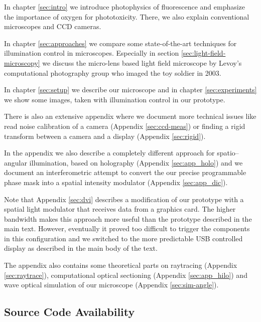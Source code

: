 \documentclass[oneside,a4paper,12pt,BCOR20mm,DIV14]{scrbook}
\begin{document}
In chapter \ref{sec:intro} we introduce photophysics of fluorescence
and emphasize the importance of oxygen for phototoxicity. There, we
also explain conventional microscopes and CCD cameras.

In chapter \ref{sec:approaches} we compare some state-of-the-art
techniques for illumination control in microscopes. %
Especially in section \ref{sec:light-field-microscopy} we discuss the
micro-lens based light field microscope by Levoy's computational
photography group who imaged the toy soldier in 2003.

In chapter \ref{sec:setup} we describe our microscope and in chapter
\ref{sec:experiments} we show some images, taken with illumination
control in our prototype.

There is also an extensive appendix where we document more technical
issues like read noise calibration of a camera (Appendix
\ref{sec:ccd-meas}) or finding a rigid transform between a camera and
a display (Appendix \ref{sec:rigid}).

In the appendix we also describe a completely different approach for
spatio--angular illumination, based on holography (Appendix
\ref{sec:app_holo}) and we document an interferometric attempt to
convert the our precise programmable phase mask into a spatial
intensity modulator (Appendix \ref{sec:app_dic}).

Note that Appendix \ref{sec:dvi} describes a modification of our
prototype with a spatial light modulator that receives data from a
graphics card. The higher bandwidth makes this approach more useful
than the prototype described in the main text. However, eventually it
proved too difficult to trigger the components in this configuration
and we switched to the more predictable USB controlled display as
described in the main body of the text.
 
The appendix also contains some theoretical parts on raytracing
(Appendix \ref{sec:raytrace}), computational optical sectioning
(Appendix \ref{sec:app_hilo}) and wave optical simulation of our
microscope (Appendix \ref{sec:sim-angle}).

\subsection*{Source Code Availability}
\end{document}
